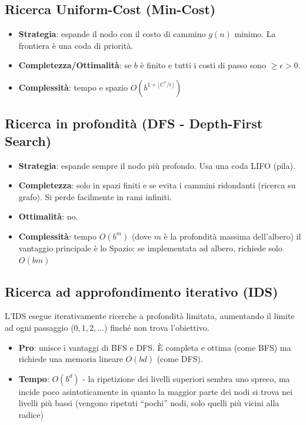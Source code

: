 \documentclass[a4paper,11pt]{report}
\begin{document}
\subsection{Ricerca Uniform-Cost (Min-Cost)}
\begin{itemize}
    \item \textbf{Strategia}: espande il nodo con il costo di cammino $g(n)$ minimo. La frontiera è una coda di priorità.
    \item \textbf{Completezza/Ottimalità}: se $b$ è finito e tutti i costi di passo sono $\ge \epsilon > 0$.
    \item \textbf{Complessità}: tempo e spazio $O(b^{1+\lfloor C^*/\epsilon \rfloor})$
\end{itemize}

\subsection{Ricerca in profondità (DFS - Depth-First Search)}
\begin{itemize}
    \item \textbf{Strategia}: espande sempre il nodo più profondo. Usa una coda LIFO (pila).
    \item \textbf{Completezza}: solo in spazi finiti e se evita i cammini ridondanti (ricerca su grafo). Si perde facilmente in rami infiniti.
    \item \textbf{Ottimalità}: no.
    \item \textbf{Complessità}: tempo $O(b^m)$ (dove $m$ è la profondità massima dell'albero)
        \subitem il vantaggio principale è lo Spazio: se implementata ad albero, richiede solo $O(bm)$
\end{itemize}

\subsection{Ricerca ad approfondimento iterativo (IDS)}
L'IDS esegue iterativamente ricerche a profondità limitata, aumentando il limite ad ogni passaggio ($0, 1, 2, \dots$) finché non trova l'obiettivo.
\begin{itemize}
    \item \textbf{Pro}: unisce i vantaggi di BFS e DFS. È completa e ottima (come BFS) ma richiede una memoria lineare $O(bd)$ (come DFS).
    \item \textbf{Tempo}: $O(b^d)$ - la ripetizione dei livelli superiori sembra uno spreco, ma incide poco asintoticamente in quanto la maggior parte dei nodi si trova nei livelli più bassi (vengono ripetuti ``pochi'' nodi, solo quelli più vicini alla radice)
\end{itemize}
\end{document}
